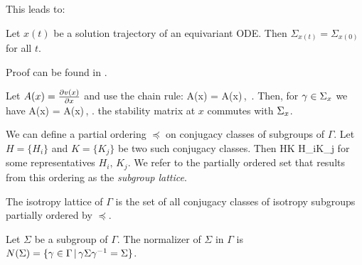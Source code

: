 This leads to:
\begin{proposition}
 Let $x(t)$ be a solution trajectory of an equivariant ODE. Then $\Sigma_{x(t)}=\Sigma_{x(0)}$ for all $t$.
\label{pro:gfInv}
\end{proposition}
Proof can be found in .

Let $A(x)=\frac{\partial v(x)}{\partial x}$ and use the chain rule:
\beq
	A(\gamma x) \gamma = \gamma A(x)\,, \qquad \gamma\in\Gamma\,.
	\label{eq:LrzGroupOrb}
\eeq
Then, for $\gamma\in\Sigma_{x}$ we have
\beq
	A(x) \gamma = \gamma A(x)\,, \qquad \gamma\in{}.
	\label{eq:LrzCommut}
\eeq
\ie the stability matrix at $x$ commutes with $\Sigma_{x}$.

We can define a partial ordering $\preceq$ on conjugacy classes of subgroups of $\Gamma$. Let $H=\{H_i\}$ and $K=\{K_j\}$
be two such conjugacy classes. Then
\beq
	H\preceq K \Leftrightarrow H_i\subseteq K_j
	\label{eq:Gorder}
\eeq
for some representatives $H_i,\,K_j$. We refer to the partially ordered set that results from this ordering as the \emph{subgroup lattice}.

\begin{definition}
 The isotropy lattice of $\Gamma$ is the set of all conjugacy classes of isotropy subgroups
 partially ordered by $\preceq$.
\end{definition}

\begin{definition}
 Let $\Sigma$ be a subgroup of $\Gamma$. The normalizer of $\Sigma$ in $\Gamma$ is
 $N(\Sigma)=\{\gamma\in\Gamma\, |\, \gamma\Sigma\gamma^{-1}=\Sigma\}$.
\end{definition}

